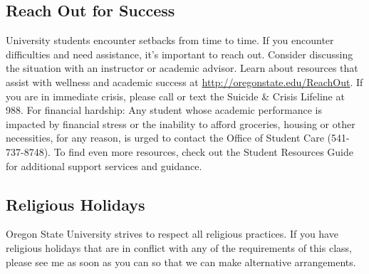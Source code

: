 \documentclass[10pt]{article}
\begin{document}
\subsection*{Reach Out for Success}
\noindent
University students encounter setbacks from time to time. If you encounter difficulties and need 
assistance, it’s important to reach out. Consider discussing the situation with an instructor or 
academic advisor. Learn about resources that assist with wellness and academic success at 
\href{http://oregonstate.edu/ReachOut}{http://oregonstate.edu/ReachOut}. 
If you are in immediate crisis, please call or text the Suicide \& Crisis Lifeline at 988.
For financial hardship:
Any student whose academic performance is impacted by financial stress or the inability to afford 
groceries, housing or other necessities, for any reason, is urged to contact the Office of Student 
Care (541-737-8748).
To find even more resources, check out the Student Resources Guide for additional support services 
and guidance.

\subsection*{Religious Holidays}
\noindent
Oregon State University strives to respect all religious practices.
If you have religious holidays that are in conflict with any of the requirements of 
this class, please see me as soon as you can so that we can make alternative 
arrangements.
\end{document}
